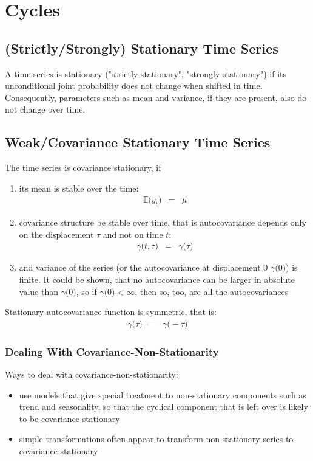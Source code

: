 \chapter{Cycles}

\section{(Strictly/Strongly) Stationary Time Series}
A time series is stationary ("strictly stationary", "strongly stationary") if its unconditional joint probability does not change when shifted in time. Consequently, parameters such as mean and variance, if they are present, also do not change over time.

\section{Weak/Covariance Stationary Time Series}
The time series is covariance stationary, if
\begin{enumerate}
	\item its mean is stable over the time:
	\begin{eqnarray}
	\mathbb{E}\Big(y_{t}\Big) &=& \mu
	\end{eqnarray}
	\item covariance structure be stable over time, that is autocovariance depends only on the displacement $\tau$ and not on time $t$:
	\begin{eqnarray}
	\gamma\Big(t, \tau\Big) &=& \gamma\Big(\tau\Big)
	\end{eqnarray}
	\item and variance of the series \Big(or the autocovariance at displacement 0 $\gamma\big(0\big)$\Big) is finite. It could be shown, that no autocovariance can be larger in absolute value than $\gamma\big(0\big)$, so if $\gamma\big(0\big) < \infty$, then so, too, are all the autocovariances
\end{enumerate}
Stationary autocovariance function is symmetric, that is:
\begin{eqnarray}
\gamma\big(\tau\big) &=& \gamma\big(-\tau\big)
\end{eqnarray}

\subsection{Dealing With Covariance-Non-Stationarity}
Ways to deal with covariance-non-stationarity:
\begin{itemize}
	\item use models that give special treatment to non-stationary components such as trend and seasonality, so that the cyclical component that is left over is likely to be covariance stationary
	\item simple transformations often appear to transform non-stationary series to covariance stationary 
\end{itemize}

